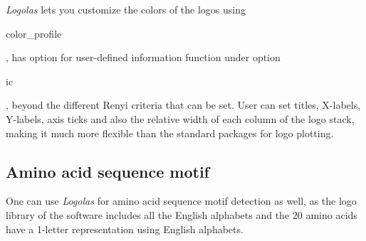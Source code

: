 \documentclass[12pt]{article}\usepackage[]{graphicx}\usepackage[usenames,dvipsnames]{color}
\newcommand{\Logolas}{\textit{Logolas}}
\begin{document}
\newpage

\Logolas{} lets you customize the colors of the logos using \begin{verb} color_profile \end{verb}, has option for user-defined information function under option \begin{verb} ic \end{verb},  beyond the different Renyi criteria that can be set. User can set titles, X-labels, Y-labels, axis ticks and also the relative width of each column of the logo stack, making it much more flexible than the standard packages for logo plotting.

\subsection{Amino acid sequence motif}

One can use \Logolas{} for amino acid sequence motif detection as well, as the logo library of the software includes all the English alphabets and the 20 amino acids have a 1-letter representation using English alphabets.
\end{document}

